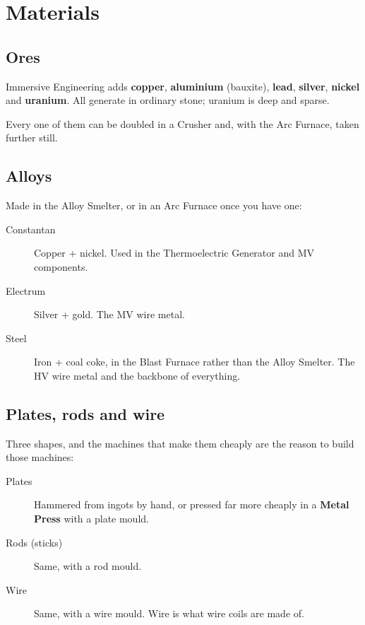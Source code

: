 \chapter{Materials}
\label{ch:materials}

\section{Ores}

Immersive Engineering adds \textbf{copper}, \textbf{aluminium} (bauxite), \textbf{lead},
\textbf{silver}, \textbf{nickel} and \textbf{uranium}. All generate in ordinary stone; uranium is
deep and sparse.

Every one of them can be doubled in a Crusher and, with the Arc Furnace, taken further still.

\section{Alloys}

Made in the Alloy Smelter, or in an Arc Furnace once you have one:

\begin{description}
\item[Constantan] Copper + nickel. Used in the Thermoelectric Generator and MV components.
\item[Electrum] Silver + gold. The MV wire metal.
\item[Steel] Iron + coal coke, in the Blast Furnace rather than the Alloy Smelter. The HV wire
      metal and the backbone of everything.
\end{description}

\section{Plates, rods and wire}

Three shapes, and the machines that make them cheaply are the reason to build those machines:

\begin{description}
\item[Plates] Hammered from ingots by hand, or pressed far more cheaply in a \textbf{Metal Press}
      with a plate mould.
\item[Rods (sticks)] Same, with a rod mould.
\item[Wire] Same, with a wire mould. Wire is what wire coils are made of.
\end{description}

